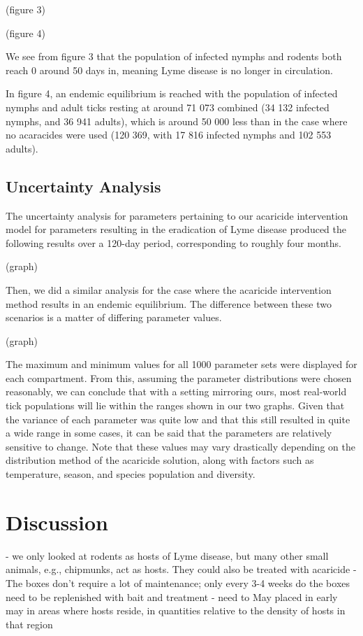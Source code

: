 \documentclass[12pt, centerh1]{article}
\begin{document}
(figure 3)

(figure 4)

We see from figure 3 that the population of infected nymphs and rodents both reach 0 around 50 days in, meaning Lyme disease is no longer in circulation. 

In figure 4, an endemic equilibrium is reached with the population of infected nymphs and adult ticks resting at around 71 073 combined (34 132 infected nymphs, and 36 941 adults), which is around 50 000 less than in the case where no acaracides were used (120 369, with 17 816 infected nymphs and 102 553 adults).

\subsection{Uncertainty Analysis}
The uncertainty analysis for parameters pertaining to our acaricide intervention model for parameters resulting in the eradication of Lyme disease produced the following results over a 120-day period, corresponding to roughly four months.

(graph)

Then, we did a similar analysis for the case where the acaricide intervention method results in an endemic equilibrium. The difference between these two scenarios is a matter of differing parameter values.

(graph)

The maximum and minimum values for all 1000 parameter sets were displayed for each compartment. From this, assuming the parameter distributions were chosen reasonably, we can conclude that with a setting mirroring ours, most real-world tick populations will lie within the ranges shown in our two graphs. Given that the variance of each parameter was quite low and that this still resulted in quite a wide range in some cases, it can be said that the parameters are relatively sensitive to change. Note that these values may vary drastically depending on the distribution method of the acaricide solution, along with factors such as temperature, season, and species population and diversity.

\section{Discussion}

- we only looked at rodents as hosts of Lyme disease, but many other small animals, e.g., chipmunks, act as hosts. They could also be treated with acaricide 
- The boxes don't require a lot of maintenance; only every 3-4 weeks do the boxes need to be replenished with bait and treatment
- need to May placed in early may in areas where hosts reside, in quantities relative to the density of hosts in that region
\end{document}

